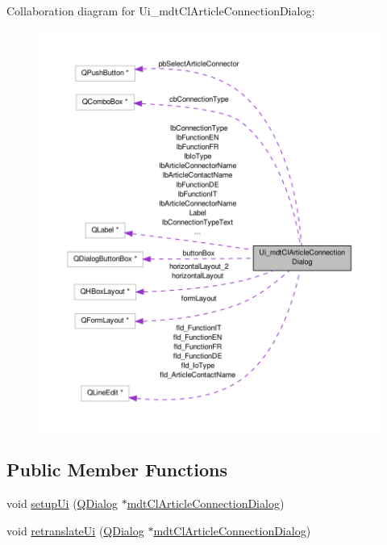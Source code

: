 Collaboration diagram for Ui\-\_\-mdt\-Cl\-Article\-Connection\-Dialog\-:\nopagebreak
\begin{figure}[H]
\begin{center}
\leavevmode
\includegraphics[width=350pt]{class_ui__mdt_cl_article_connection_dialog__coll__graph}
\end{center}
\end{figure}
\subsection*{Public Member Functions}
\begin{DoxyCompactItemize}
\item 
void \hyperlink{class_ui__mdt_cl_article_connection_dialog_a2c93c7064749c657097287478b768c6d}{setup\-Ui} (\hyperlink{class_q_dialog}{Q\-Dialog} $\ast$\hyperlink{classmdt_cl_article_connection_dialog}{mdt\-Cl\-Article\-Connection\-Dialog})
\item 
void \hyperlink{class_ui__mdt_cl_article_connection_dialog_ad4e9f7265bd0ead238e88f0644979b84}{retranslate\-Ui} (\hyperlink{class_q_dialog}{Q\-Dialog} $\ast$\hyperlink{classmdt_cl_article_connection_dialog}{mdt\-Cl\-Article\-Connection\-Dialog})
\end{DoxyCompactItemize}
